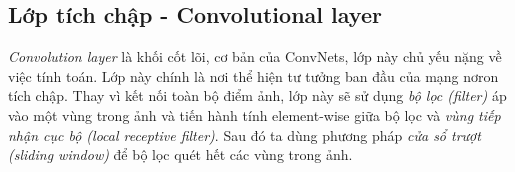 \subsection{Lớp tích chập - Convolutional layer}
  \textit{Convolution layer} là khối cốt lõi, cơ bản của ConvNets, lớp này chủ yếu nặng về việc tính toán. Lớp này chính là nơi thể hiện tư tưởng ban đầu của mạng nơron tích chập. Thay vì kết nối toàn bộ điểm ảnh, lớp này sẽ sử dụng \textit{bộ lọc (filter)} áp vào một vùng trong ảnh và tiến hành tính element-wise giữa bộ lọc và \textit{vùng tiếp nhận cục bộ (local receptive filter)}. Sau đó ta dùng phương pháp \textit{cửa sổ trượt (sliding window)} để bộ lọc quét hết các vùng trong ảnh. 
\begin{figure}[H]

\hfill
{}\hfill
{}\\
\hfill

\end{figure}

